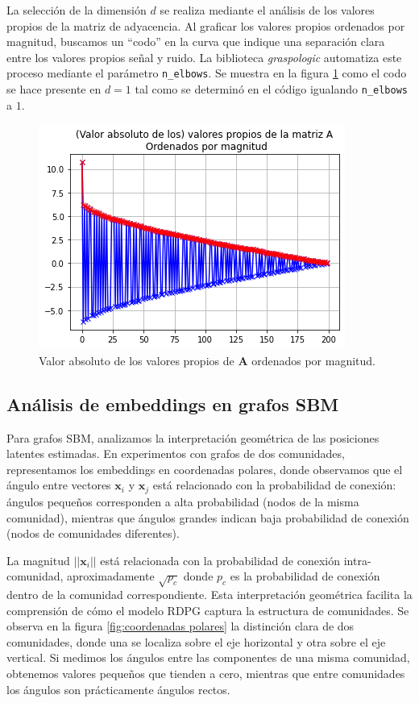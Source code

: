\documentclass{article}
\begin{document}
La selección de la dimensión $d$ se realiza mediante el análisis de los valores propios de la matriz de adyacencia. Al graficar los valores propios ordenados por magnitud, buscamos un ``codo'' en la curva que indique una separación clara entre los valores propios señal y ruido. La biblioteca \textit{graspologic} automatiza este proceso mediante el parámetro \verb|n_elbows|. Se muestra en la figura \ref{fig:valores propios} como el codo se hace presente en $d=1$ tal como se determinó en el código igualando \verb|n_elbows| a $1$. 

\begin{figure}[htb]
    \centering
    \includegraphics[width=0.5\linewidth]{images/valores_propios.png}
    \caption{Valor absoluto de los valores propios de $\mathbf{A}$ ordenados por magnitud.}
    \label{fig:valores propios}
\end{figure}

\subsection{Análisis de embeddings en grafos SBM}

Para grafos SBM, analizamos la interpretación geométrica de las posiciones latentes estimadas. En experimentos con grafos de dos comunidades, representamos los embeddings en coordenadas polares, donde observamos que el ángulo entre vectores $\mathbf{x}_i$ y $\mathbf{x}_j$ está relacionado con la probabilidad de conexión: ángulos pequeños corresponden a alta probabilidad (nodos de la misma comunidad), mientras que ángulos grandes indican baja probabilidad de conexión (nodos de comunidades diferentes).

La magnitud $||\mathbf{x}_i||$ está relacionada con la probabilidad de conexión intra-comunidad, aproximadamente $\sqrt{p_c}$ donde $p_c$ es la probabilidad de conexión dentro de la comunidad correspondiente. Esta interpretación geométrica facilita la comprensión de cómo el modelo RDPG captura la estructura de comunidades. Se observa en la figura \ref{fig:coordenadas polares} la distinción clara de dos comunidades, donde una se localiza sobre el eje horizontal y otra sobre el eje vertical. Si medimos los ángulos entre las componentes de una misma comunidad, obtenemos valores pequeños que tienden a cero, mientras que entre comunidades los ángulos son prácticamente ángulos rectos.
\end{document}

